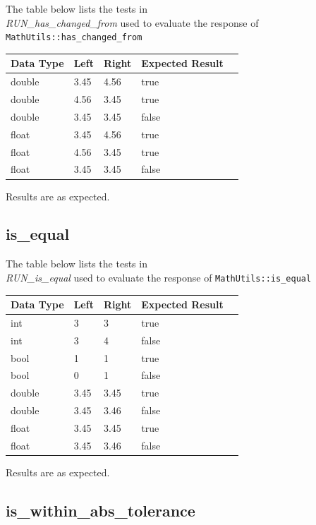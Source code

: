 \documentclass[11pt,fleqn]{report}
\begin{document}
The table below lists the tests in \\ \textit{RUN\_has\_changed\_from} used to evaluate
the response of \texttt{MathUtils::has\_changed\_from}
\begin{center}
\begin{tabular}{|l||l|l|l|l|}
\hline
 \textbf{Data Type} & \textbf{Left} & \textbf{Right} 
 & \textbf{Expected Result} \\
\hline \hline
double & 3.45 & 4.56 & true \\
double & 4.56 & 3.45 & true \\
double & 3.45 & 3.45 & false \\
float& 3.45 & 4.56 & true \\
float& 4.56 & 3.45 & true \\
float& 3.45 & 3.45 & false \\
\hline \hline
\end{tabular}
\end{center}

Results are as expected.

\subsection{is\_equal}
The table below lists the tests in \\ \textit{RUN\_is\_equal} used to evaluate the response of
\texttt{MathUtils::is\_equal}
\begin{center}
\begin{tabular}{|l||l|l|l|l|}
\hline
 \textbf{Data Type} & \textbf{Left} & \textbf{Right} 
 & \textbf{Expected Result} \\
\hline \hline
int& 3 & 3 & true \\
int& 3 & 4 & false \\
bool & 1 & 1 & true \\
bool & 0 & 1 & false \\
double & 3.45& 3.45& true \\
double & 3.45& 3.46& false \\
float& 3.45& 3.45& true \\
float& 3.45& 3.46& false \\
\hline \hline
\end{tabular}
\end{center}

Results are as expected.

\subsection{is\_within\_abs\_tolerance}
\end{document}
